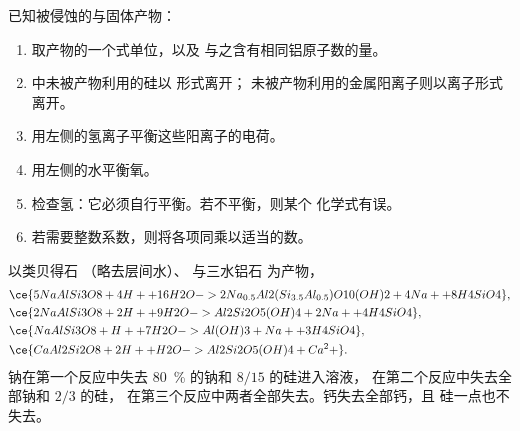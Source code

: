 \begin{method}[配平水解反应]\label{met:b1:weathering-clays:balance}
已知被侵蚀的与固体产物：
\begin{enumerate}
  \item 取产物的一个式单位，以及
        与之含有相同铝原子数的量。
  \item {}中未被产物利用的硅以  形式离开；
        未被产物利用的金属阳离子则以离子形式离开。
  \item 用左侧的氢离子平衡这些阳离子的电荷。
  \item 用左侧的水平衡氧。
  \item 检查氢：它必须自行平衡。若不平衡，则某个
        化学式有误。
  \item 若需要整数系数，则将各项同乘以适当的数。
\end{enumerate}
\end{method}

\begin{proposition}[长石的水解]\label{prop:b1:weathering-clays:feldspars}
以类贝得石 
（略去层间水）、  与三水铝石
 为产物，
\begin{align*}
&\ce{5 NaAlSi3O8 + 4 H+ + 16 H2O -> 2 Na_{0.5}Al2(Si_{3.5}Al_{0.5})O10(OH)2 + 4 Na+ + 8 H4SiO4},\\ %
&\ce{2 NaAlSi3O8 + 2 H+ + 9 H2O -> Al2Si2O5(OH)4 + 2 Na+ + 4 H4SiO4},\\
&\ce{NaAlSi3O8 + H+ + 7 H2O -> Al(OH)3 + Na+ + 3 H4SiO4},\\
&\ce{CaAl2Si2O8 + 2 H+ + H2O -> Al2Si2O5(OH)4 + Ca^2+}.
\end{align*}
钠在第一个反应中失去 \qty{80}{\percent} 的钠和 $8/15$ 的硅进入溶液，
在第二个反应中失去全部钠和 $2/3$ 的硅，
在第三个反应中两者全部失去。钙失去全部钙，且
硅一点也不失去。
\end{proposition}

